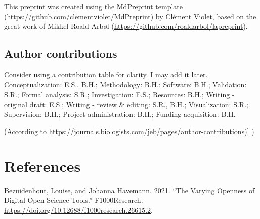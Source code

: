 \documentclass[9pt,biorxiv,doublespacing,lineno]{lapreprint}
\newlength{\cslhangindent}
\newlength{\cslentryspacingunit} %
\newenvironment{CSLReferences}[2] %
 {%
  \setlength{\parindent}{0pt}
  \ifodd #1
  \let\oldpar\par
  \def\par{\hangindent=\cslhangindent\oldpar}
  \fi
  \setlength{\parskip}{#2\cslentryspacingunit}
 }%
 {}
\begin{document}
This preprint was created using the MdPreprint template
(\url{https://github.com/clementviolet/MdPreprint}) by Clément Violet,
based on the great work of Mikkel Roald-Arbøl
(\url{https://github.com/roaldarbol/lapreprint}).

\hypertarget{author-contributions}{%
\subsection{Author contributions}\label{author-contributions}}

Consider using a contribution table for clarity. I may add it later.
Conceptualization: E.S., B.H.; Methodology: B.H.; Software: B.H.;
Validation: S.R.; Formal analysis: S.R.; Investigation: E.S.; Resources:
B.H.; Writing - original draft: E.S.; Writing - review \& editing: S.R.,
B.H.; Visualization: S.R.; Supervision: B.H.; Project administration:
B.H.; Funding acquisition: B.H.

(According to
\href{https://journals.biologists.com/jeb/pages/author-contributions}{https://journals.biologists.com/jeb/pages/author-contributions)}{]}
)

\hypertarget{references}{%
\section*{References}\label{references}}

\hypertarget{refs}{}
\begin{CSLReferences}{1}{0}
\leavevmode{}%
Bezuidenhout, Louise, and Johanna Havemann. 2021. {``The Varying
Openness of Digital Open Science Tools.''} F1000Research.
\url{https://doi.org/10.12688/f1000research.26615.2}.

\end{CSLReferences}

\if@endfloat\clearpage\processdelayedfloats\clearpage\fi 




\end{document}
